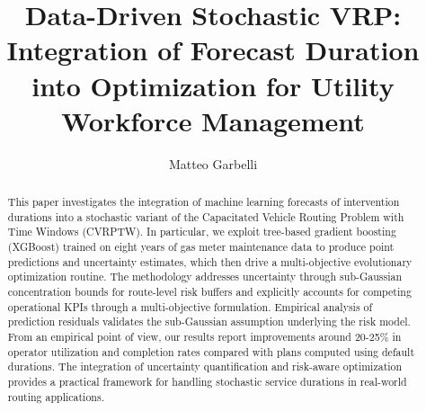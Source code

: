 \documentclass[preprint,12pt]{elsarticle}
\begin{document}
\begin{frontmatter}

\title{Data-Driven Stochastic VRP: Integration of Forecast Duration into Optimization for Utility Workforce Management}

\author[univ]{Matteo Garbelli}



\begin{abstract}
This paper investigates the integration of machine learning forecasts of intervention durations into a stochastic variant of the Capacitated Vehicle Routing Problem with Time Windows (CVRPTW). In particular, we exploit tree-based gradient boosting (XGBoost) trained on eight years of gas meter maintenance data to produce point predictions and uncertainty estimates, which then drive a multi-objective evolutionary optimization routine. The methodology addresses uncertainty through sub-Gaussian concentration bounds for route-level risk buffers and explicitly accounts for competing operational KPIs through a multi-objective formulation. Empirical analysis of prediction residuals validates the sub-Gaussian assumption underlying the risk model. From an empirical point of view, our results report improvements around 20-25\% in operator utilization and completion rates compared with plans computed using default durations. The integration of uncertainty quantification and risk-aware optimization provides a practical framework for handling stochastic service durations in real-world routing applications.
\end{abstract}





\end{frontmatter}
\end{document}
